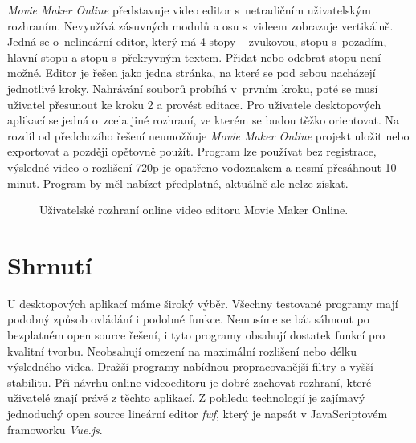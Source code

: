 \textit{Movie Maker Online} představuje video editor s~netradičním uživatelským rozhraním. Nevyužívá zásuvných modulů a osu s~videem zobrazuje vertikálně. Jedná se o~nelineární editor, který má 4 stopy -- zvukovou, stopu s~pozadím, hlavní stopu a stopu s~překryvným textem. Přidat nebo odebrat stopu není možné. Editor je řešen jako jedna stránka, na které se pod sebou nacházejí jednotlivé kroky. Nahrávání souborů probíhá v~prvním kroku, poté se musí uživatel přesunout ke kroku 2 a provést editace. Pro uživatele desktopových aplikací se jedná o~zcela jiné rozhraní, ve kterém se budou těžko orientovat. Na rozdíl od předchozího řešení neumožňuje \textit{Movie Maker Online} projekt uložit nebo exportovat a později opětovně použít. Program lze používat bez registrace, výsledné video o rozlišení 720p je opatřeno vodoznakem a nesmí přesáhnout 10 minut. Program by měl nabízet předplatné, aktuálně ale nelze získat.
\begin{figure}[h]
	\centering
	\caption{Uživatelské rozhraní online video editoru Movie Maker Online.}\label{img:moviemakeronline}
\end{figure}

\section{Shrnutí}
U desktopových aplikací máme široký výběr. Všechny testované programy mají podobný způsob ovládání i podobné funkce. Nemusíme se bát sáhnout po bezplatném open source řešení, i tyto programy obsahují dostatek funkcí pro kvalitní tvorbu. Neobsahují omezení na maximální rozlišení nebo délku výsledného videa. Dražší programy nabídnou propracovanější filtry a vyšší stabilitu. Při návrhu online videoeditoru je dobré zachovat rozhraní, které uživatelé znají právě z těchto aplikací. Z pohledu technologií je zajímavý jednoduchý open source lineární editor \textit{fwf}, který je napsát v JavaScriptovém framoworku \textit{Vue.js}.

